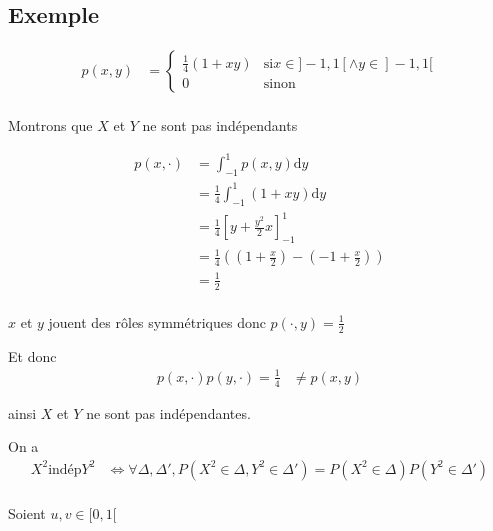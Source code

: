 \documentclass{article}
\newcommand{\dy}{\mathrm{d}y}
\begin{document}
\subsection{Exemple}

\begin{align*}
	p(x, y) &= \begin{cases}
		\frac{1}{4}(1+xy) &\text{si} x\in ]-1, 1[ \land y \in ]-1, 1[  \\
		0 &\text{sinon}
	\end{cases} \\
\end{align*}

Montrons que $X$ et $Y$  ne sont pas indépendants

\begin{align*}
	p(x,  \cdot ) &= \int_{-1}^{1} p(x, y) \dy \\ 
		      &= \frac{1}{4} \int_{-1}^1 (1+xy) \dy \\
		      &= \frac{1}{4} \left[ y + \frac{y^2}{2} x \right]_{-1}^1 \\
		      &= \frac{1}{4} \left( \left( 1+\frac{x}{2} \right) - \left( -1 + \frac{x}{2} \right)  \right)  \\
		      &= \frac{1}{2} \\
\end{align*}

$x$ et $y$ jouent des rôles symmétriques donc $p( \cdot , y) = \frac{1}{2}$

Et donc 
\begin{align*}
	p(x,  \cdot ) p(y,  \cdot ) = \frac{1}{4} &\neq p(x, y)
\end{align*}

ainsi $X$ et $Y$ ne sont pas indépendantes.


On a
\begin{align*}
	X^2 \text{indép} Y^2 &\iff \forall \Delta, \Delta', P(X^2 \in \Delta, Y^2\in \Delta') = P(X^2\in \Delta) P(Y^2\in \Delta') \\
\end{align*}

Soient $u, v \in [0, 1[$
\end{document}
